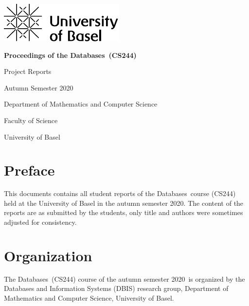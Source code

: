 \documentclass[runningheads,a4paper,table]{llncs}
\newenvironment{produceProceedings}{}{}
\newcommand{\coursename}{Databases}
\newcommand{\courseacronym}{CS244}
\newcommand{\semester}{autumn semester 2020}
\newcommand{\Semester}{Autumn Semester 2020}
\newcommand{\proceedingsSubtitle}{Project Reports}
\begin{document}
	
\begin{produceProceedings}
	
	\begin{titlepage}
		\includegraphics{UniBas_Logo_EN_Schwarz_RGB_65}
		
		\vspace{80pt}
		
		\centering
		
		\begin{spacing}{2.8}
		{\Huge {} \bfseries Proceedings of the \coursename\ (\courseacronym)}
		\end{spacing}
		
		\vspace{25pt}
		
		{\large \proceedingsSubtitle}
		
		\vspace{50pt}
		
		{\large \Semester}
		
		\vspace{50pt}
		
		{\large	Department of Mathematics and Computer Science}
		
		\vspace{5pt}
		
		{\large Faculty of Science}
		
		\vspace{25pt}
		
		{\large	University of Basel}
	\end{titlepage}
	
	
	\pagestyle{headings}
	\chapter*{Preface}
	This documents contains all student reports of the \coursename\ course (\courseacronym) held at the University of Basel in the \semester.%
    The content of the reports are as submitted by the students, only title and authors were sometimes adjusted for consistency.
	\chapter*{Organization}
	The \coursename\ (\courseacronym) course of the \semester\ is organized by the Databases and Information Systems (DBIS) research group, Department of Mathematics and Computer Science, University of Basel.

\end{produceProceedings}
\end{document}
